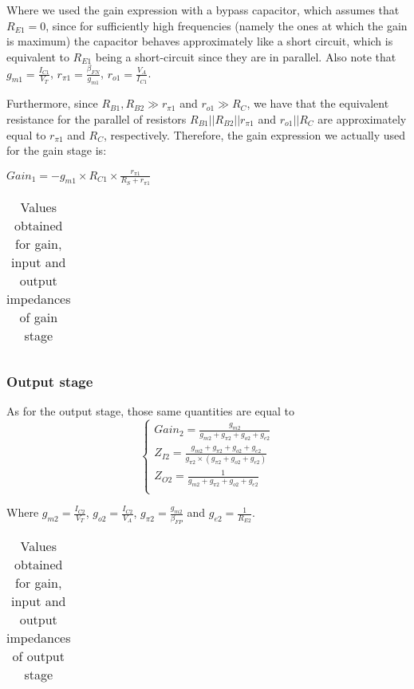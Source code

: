 Where we used the gain expression with a bypass capacitor, which assumes that $R_{E1} = 0$, since for sufficiently high frequencies (namely the ones at which the gain is maximum) the capacitor behaves approximately like a short circuit, which is equivalent to $R_{E1}$ being a short-circuit since they are in parallel. Also note that $g_{m1}=\frac{I_{C1}}{V_T}$, $r_{\pi 1}=\frac{\beta_{FN}}{g_{m1}}$, $r_{o1}=\frac{V_A}{I_{C1}}$.

Furthermore, since $R_{B1}, R_{B2} \gg r_{\pi1}$ and $r_{o1} \gg R_C$, we have that the equivalent resistance for the parallel of resistors $R_{B1} || R_{B2} || r_{\pi1}$ and $r_{o1} || R_C$ are approximately equal to $r_{\pi1}$ and $R_C$, respectively. Therefore, the gain expression we actually used for the gain stage is:


$Gain_1 = -g_{m1} \times R_{C1} \times \frac{r_{\pi1}}{R_S+r_{\pi1}}$


\begin{table}[H]
  \centering
  \begin{tabular}{|c|c|}
    \hline
      
  \end{tabular}
  \caption{Values obtained for gain, input and output impedances of gain stage}
  \label{tab:resultsAC1}
\end{table}


\subsubsection{Output stage}
As for the output stage, those same quantities are equal to
\begin{equation}
\begin{cases}
Gain_2 = \frac{g_{m2}}{g_{m2}+g_{\pi 2}+g_{o2}+g_{e2}} \\ %
Z_{I2}= \frac{g_{m2}+g_{\pi 2}+g_{o2}+g_{e2}}{g_{\pi 2} \times (g_{\pi 2}+g_{o2}+g_{e2})} \\ %
Z_{O2} = \frac{1}{g_{m2}+g_{\pi 2}+g_{o2}+g_{e2}} \\ %
\end{cases}
\end{equation}

Where $g_{m2} = \frac{I_{C2}}{V_T}$, $g_{o2} = \frac{I_{C2}}{V_A}$, $g_{\pi 2} = \frac{g_{m2}}{\beta_{FP}}$ and $g_{e2} = \frac{1}{R_{E2}}$.

\begin{table}[H]
  \centering
  \begin{tabular}{|c|c|}
    \hline
      
  \end{tabular}
  \caption{Values obtained for gain, input and output impedances of output stage}
  \label{tab:resultsAC2}
\end{table}

